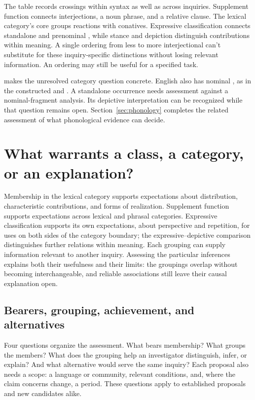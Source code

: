 \documentclass[12pt]{article}
\begin{document}
The table records crossings within syntax as well as across inquiries.
Supplement function connects interjections, a noun phrase, and a relative
clause. The lexical category's core groups reactions with conatives.
Expressive classification connects standalone and prenominal ,
while stance and depiction distinguish contributions within meaning.
A single ordering from less to more interjectional can't
substitute for these inquiry-specific distinctions without losing relevant
information. An ordering may still be useful for a specified task.

 makes the unresolved category question concrete.
English also has nominal , as in the constructed
 and . A standalone occurrence
needs assessment against a nominal-fragment analysis.
Its depictive interpretation can be recognized while that question remains
open. Section~\ref{sec:phonology} completes the related assessment of
what phonological evidence can decide.

\section{What warrants a class, a category, or an explanation?}\label{sec:assessment}

Membership in the lexical category supports expectations about distribution,
characteristic contributions, and forms of realization. Supplement function
supports expectations across lexical and phrasal categories. Expressive
classification supports its own expectations, about perspective and
repetition, for uses on both sides of the category boundary; the
expressive--depictive
comparison distinguishes further relations within meaning. Each grouping
can supply information relevant to another inquiry. Assessing the particular
inferences explains both their usefulness and their limits: the groupings
overlap without becoming interchangeable, and reliable associations still
leave their causal explanation open.

\subsection{Bearers, grouping, achievement, and alternatives}

Four questions organize the assessment. What bears membership? What groups
the members? What does the grouping help an investigator distinguish,
infer, or explain? And what alternative would serve the same inquiry?
Each proposal also needs a scope: a language or community, relevant
conditions, and, where the claim concerns change, a period. These
questions apply to established proposals and new candidates alike.
\end{document}
